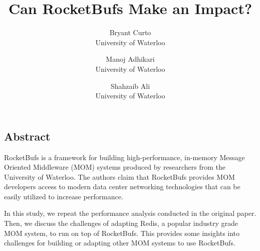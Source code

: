 \documentclass[letterpaper,twocolumn,10pt]{article}
\begin{document}
\date{}

\title{\Large \bf Can RocketBufs Make an Impact?}

\author{
{\rm Bryant Curto}\\
University of Waterloo
\and
{\rm Manoj Adhikari}\\
University of Waterloo
\and
{\rm Shahzaib Ali}\\
University of Waterloo
} %

\maketitle

\thispagestyle{empty}


\subsection*{Abstract}
    
RocketBufs is a framework for building high-performance, in-memory Message Oriented Middleware (MOM) systems produced by researchers from the University of Waterloo.
The authors claim that RocketBufs provides MOM developers access to modern data center networking technologies that can be easily utilized to increase performance.

In this study, we repeat the performance analysis conducted in the original paper.
Then, we discuss the challenges of adapting Redis, a popular industry grade MOM system, to run on top of RocketBufs.
This provides some insights into challenges for building or adapting other MOM systems to use RocketBufs.
\end{document}
